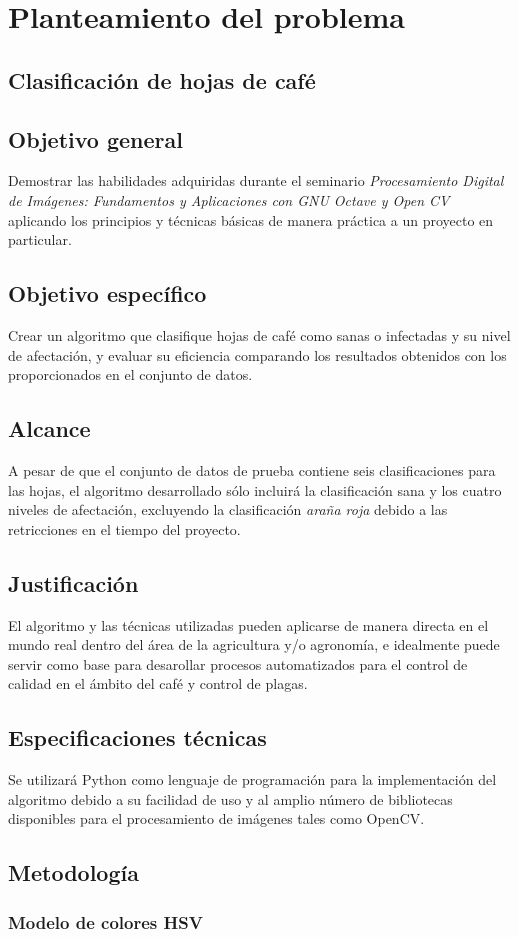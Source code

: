 \chapter{Planteamiento del problema}

\section{Clasificación de hojas de café}

\section{Objetivo general}
Demostrar las habilidades adquiridas durante el seminario \textit{Procesamiento Digital de Imágenes: Fundamentos y Aplicaciones con GNU Octave y Open CV} aplicando los principios y técnicas básicas de manera práctica a un proyecto en particular.

\section{Objetivo específico}
Crear un algoritmo que clasifique hojas de café como sanas o infectadas y su nivel de afectación, y evaluar su eficiencia comparando los resultados obtenidos con los proporcionados en el conjunto de datos.

\section{Alcance}
A pesar de que el conjunto de datos de prueba contiene seis clasificaciones para las hojas, el algoritmo desarrollado sólo incluirá la clasificación sana y los cuatro niveles de afectación, excluyendo la clasificación \textit{araña roja} debido a las retricciones en el tiempo del proyecto.

\section{Justificación}
El algoritmo y las técnicas utilizadas pueden aplicarse de manera directa en el mundo real dentro del área de la agricultura y/o agronomía, e idealmente puede servir como base para desarollar procesos automatizados para el control de calidad en el ámbito del café y control de plagas.
 
\section{Especificaciones técnicas}
Se utilizará Python como lenguaje de programación para la implementación del algoritmo debido a su facilidad de uso y al amplio número de bibliotecas disponibles para el procesamiento de imágenes tales como OpenCV.

\section{Metodología}

\subsection{Modelo de colores HSV}